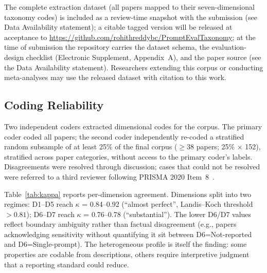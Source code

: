 \documentclass[acmsmall, nonacm, screen]{acmart}
\begin{document}
The complete extraction dataset (all papers mapped to their
seven-dimensional taxonomy codes) is included as a review-time
snapshot with the submission (see Data Availability statement);
a citable tagged version will be released at acceptance to
\url{https://github.com/rohithreddybc/PromptEvalTaxonomy}; at the time
of submission the repository carries the dataset schema, the
evaluation-design checklist (Electronic Supplement, Appendix~A), and the
paper source (see the Data Availability statement). Researchers
extending this corpus or conducting meta-analyses may use the
released dataset with citation to this work.

\subsection{Coding Reliability}
\label{subsec:coding_reliability}

Two independent coders extracted dimensional codes for the corpus.
The primary coder coded all papers; the second coder independently
re-coded a stratified random subsample of at least 25\% of
the final corpus (${\geq}38$ papers; 25\% $\times$ 152), stratified across paper categories, without
access to the primary coder's labels. Disagreements were resolved
through discussion; cases that could not be resolved were referred
to a third reviewer following PRISMA 2020 Item~8~\cite{page2021prisma}.

Table~\ref{tab:kappa} reports per-dimension agreement. Dimensions
split into two regimes: D1--D5 reach $\kappa$ = 0.84--0.92 (``almost
perfect'', Landis--Koch threshold $>0.81$); D6--D7 reach
$\kappa$ = 0.76--0.78 (``substantial''). The lower D6/D7 values
reflect boundary ambiguity rather than factual disagreement (e.g.,
papers acknowledging sensitivity without quantifying it sit between
D6=Not-reported and D6=Single-prompt). The heterogeneous profile is
itself the finding: some properties are codable from descriptions,
others require interpretive judgment that a reporting standard could
reduce.
\end{document}
